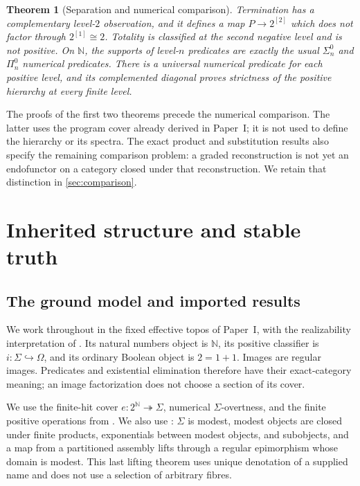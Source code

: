 \documentclass[11pt,a4paper]{article}
\numberwithin{equation}{section}
\theoremstyle{definition}
\theoremstyle{remark}
\theoremstyle{plain}
\newtheorem{maintheorem}{Theorem}
\newcommand{\N}{\mathbb N}
\newcommand{\onto}{\twoheadrightarrow}
\newcommand{\incl}{\hookrightarrow}
\newcommand{\Icite}[1]{\cite[\textnormal{#1}]{sheridan}}
\begin{document}
\begin{maintheorem}[Separation and numerical comparison]
\label{main:separation}
Termination has a complementary level-$2$ observation, and it defines a
map $P\to2^{[2]}$ which does not factor through $2^{[1]}\cong2$.
Totality is classified at the second negative level and is not positive.
On $\N$, the supports of level-$n$ predicates are exactly the usual
$\Sigma^0_n$ and $\Pi^0_n$ numerical predicates. There is a universal
numerical predicate for each positive level, and its complemented diagonal
proves strictness of the positive hierarchy at every finite level.
\end{maintheorem}

The proofs of the first two theorems precede the numerical comparison.
The latter uses the program cover already derived in Paper~I; it is not
used to define the hierarchy or its spectra. The exact product and
substitution results also specify the remaining comparison problem: a
graded reconstruction is not yet an endofunctor on a category closed under
that reconstruction. We retain that distinction in \cref{sec:comparison}.

\section{Inherited structure and stable truth}
\label{sec:truth}

\subsection{The ground model and imported results}
\label{subsec:imports}

We work throughout in the fixed effective topos of Paper~I, with the
realizability interpretation of \cite{hyland,vanoosten}. Its natural
numbers object is $\N$, its positive classifier is $i:\Sigma\incl\Omega$,
and its ordinary Boolean object is $2=1+1$. Images are regular images.
Predicates and existential elimination therefore have their exact-category
meaning; an image factorization does not choose a section of its cover.

We use the finite-hit cover $e:2^{\N}\onto\Sigma$, numerical
$\Sigma$-overtness, and the finite positive operations from
\Icite{Finite-hit classification and Relative foundation}. We also use
\Icite{Function names and subobjects, Modest-target lifting, and Finite-hit
name presentations}: $\Sigma$ is modest, modest objects are closed under
finite products, exponentials between modest objects, and subobjects,
and a map from a partitioned assembly lifts through a regular epimorphism
whose domain is modest. This last lifting theorem uses unique denotation
of a supplied name and does not use a selection of arbitrary fibres.
\end{document}

